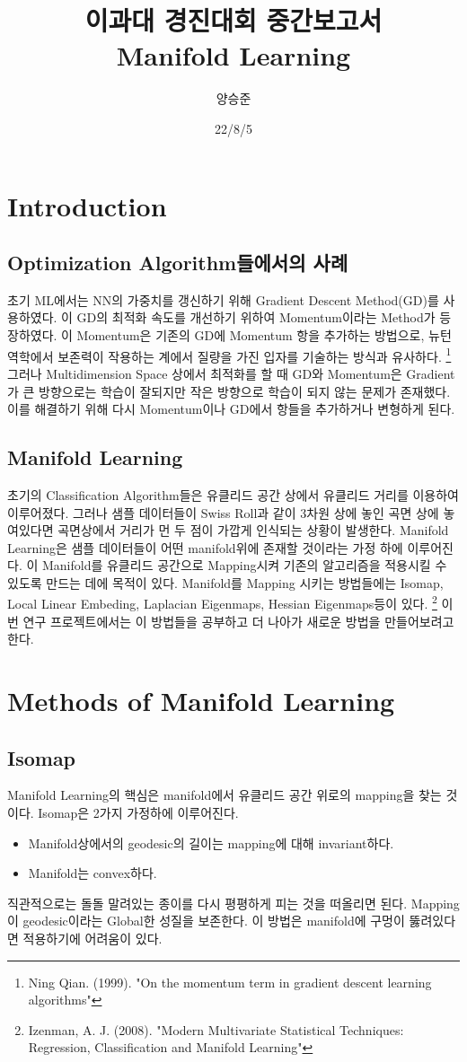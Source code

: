 \documentclass[a4paper]{article}
\title{이과대 경진대회 중간보고서\\Manifold Learning}
\date{22/8/5}
\author{양승준}
\begin{document}
    \maketitle
    \section*{Introduction}
    \subsection*{Optimization Algorithm들에서의 사례}
    초기 ML에서는 NN의 가중치를 갱신하기 위해 Gradient Descent Method(GD)를 사용하였다. 
    이 GD의 최적화 속도를 개선하기 위하여 Momentum이라는 Method가 등장하였다. 
    이 Momentum은 기존의 GD에 Momentum 항을 추가하는 방법으로, 뉴턴역학에서 보존력이 작용하는 계에서 질량을 가진 입자를 기술하는 방식과 유사하다. \footnote{Ning Qian. (1999). "On the momentum term in gradient descent learning algorithms"}
    그러나 Multidimension Space 상에서 최적화를 할 때 GD와 Momentum은 Gradient가 큰 방향으로는 학습이 잘되지만 작은 방향으로 학습이 되지 않는 문제가 존재했다. 
    이를 해결하기 위해 다시 Momentum이나 GD에서 항들을 추가하거나 변형하게 된다. 

    \subsection*{Manifold Learning}
    초기의 Classification Algorithm들은 유클리드 공간 상에서 유클리드 거리를 이용하여 이루어졌다. 
    그러나 샘플 데이터들이 Swiss Roll과 같이 3차원 상에 놓인 곡면 상에 놓여있다면 곡면상에서 거리가 먼 두 점이 가깝게 인식되는 상황이 발생한다. 
    Manifold Learning은 샘플 데이터들이 어떤 manifold위에 존재할 것이라는 가정 하에 이루어진다. 
    이 Manifold를 유클리드 공간으로 Mapping시켜 기존의 알고리즘을 적용시킬 수 있도록 만드는 데에 목적이 있다. 
    Manifold를 Mapping 시키는 방법들에는 Isomap, Local Linear Embeding, Laplacian Eigenmaps, Hessian Eigenmaps등이 있다. \footnote{Izenman, A. J. (2008). "Modern Multivariate Statistical Techniques: Regression, Classification and Manifold Learning"} 
    이번 연구 프로젝트에서는 이 방법들을 공부하고 더 나아가 새로운 방법을 만들어보려고 한다. 

    \section*{Methods of Manifold Learning}
    \subsection*{Isomap}
    Manifold Learning의 핵심은 manifold에서 유클리드 공간 위로의 mapping을 찾는 것이다. 
    Isomap은 2가지 가정하에 이루어진다. 
    \begin{itemize}
        \item Manifold상에서의 geodesic의 길이는 mapping에 대해 invariant하다.
        \item Manifold는 convex하다.
    \end{itemize}
    직관적으로는 돌돌 말려있는 종이를 다시 평평하게 피는 것을 떠올리면 된다. 
    Mapping이 geodesic이라는 Global한 성질을 보존한다. 
    이 방법은 manifold에 구멍이 뚫려있다면 적용하기에 어려움이 있다. 
\end{document}
